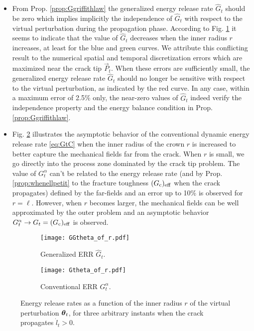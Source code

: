 \begin{itemize}
\item From Prop. \ref{prop:Ggriffithlaw} the generalized energy release rate $\widehat{G}_t$ should be zero which implies implicitly the independence of $\widehat{G}_t$ with respect to the virtual perturbation during the propagation phase. According to Fig. \ref{fig:GGalphaofr} it seems to indicate that the value of $\widehat{G}_t$ decreases when the inner radius $r$ increases, at least for the blue and green curves. We attribute this conflicting result to the numerical spatial and temporal discretization errors which are maximized near the crack tip $\vec{P}_t$. When these errors are sufficiently small, the generalized energy release rate $\widehat{G}_t$ should no longer be sensitive with respect to the virtual perturbation, as indicated by the red curve. In any case, within a maximum error of 2.5\% only, the near-zero values of $\widehat{G}_t$ indeed verify the independence property and the energy balance condition in Prop. \ref{prop:Ggriffithlaw}.

\item Fig. \ref{fig:Galphaofr} illustrates the asymptotic behavior of the conventional dynamic energy release rate \eqref{eq:GtC} when the inner radius of the crown $r$ is increased to better capture the mechanical fields far from the crack. When $r$ is small, we go directly into the process zone dominated by the crack tip problem. The value of $G^\alpha_t$ can't be related to the energy release rate (and by Prop. \ref{prop:whenellpetit} to the fracture toughness $(G_\mathrm{c})_\mathrm{eff}$ when the crack propagates) defined by the far-fields and an error up to 10\% is observed for $r=\ell$. However, when $r$ becomes larger, the mechanical fields can be well approximated by the outer problem and an asymptotic behavior $G^\alpha_t\to G_t=(G_\mathrm{c})_\mathrm{eff}$ is observed.
\end{itemize}
\begin{figure}[htbp]
\centering
\begin{subfigure}[b]{0.48\textwidth}
\centering
\texttt{[image: GGtheta\_of\_r.pdf]}
\caption{Generalized ERR $\widehat{G}_t$.} \label{fig:GGalphaofr}
\end{subfigure}
\begin{subfigure}[b]{0.48\textwidth}
\centering
\texttt{[image: Gtheta\_of\_r.pdf]}
\caption{Conventional ERR $G^\alpha_t$.} \label{fig:Galphaofr}
\end{subfigure}
\caption{Energy release rates as a function of the inner radius $r$ of the virtual perturbation $\vtheta_t$, for three arbitrary instants when the crack propagates $\dot{l}_t>0$.} \label{fig:indvelocity}
\end{figure}

